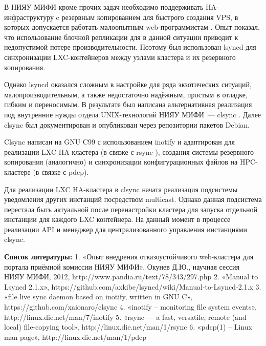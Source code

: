 \documentclass[10pt, a5paper]{article}
\begin{document}
В НИЯУ МИФИ кроме прочих задач необходимо поддерживать HA-инфраструктуру c резервным копированием для быстрого создания VPS, в которых допускается работать малоопытным web-программистам \footnotemark[1]. Опыт показал, что использование блочной репликации для в данной ситуации приводит к недопустимой потере производительности. Поэтому был использован lsyncd \footnotemark[2] для синхронизации LXC-контейнеров между узлами кластера и их резервного копирования.

Однако lsyncd оказался сложным в настройке для ряда экзотических ситуаций, малопроизводительным, а также недостаточно надёжным, простым в отладке, гибким и переносимым. В результате был написана альтернативная реализация под внутренние нужды отдела UNIX-технологий НИЯУ МИФИ — clsync \footnotemark[3]. Далее clsync был документирован и опубликован через репозитории пакетов Debian.

Clsync написан на GNU C99 с использованием inotify \footnotemark[4] и адаптирован для реализации LXC HA-кластера (в связке с rsync \footnotemark[5]), создания системы резервного копирования (аналогично) и синхронизации конфигурационных файлов на HPC-кластере (в связке с pdcp\footnotemark[6]).

Для реализации LXC HA-кластера в clsync начата реализация подсистемы уведомления других инстанций посредством multicast. Однако данная подсистема перестала быть актуальной после перенастройки кластера для запуска отдельной инстанции для каждого LXC контейнера. На данный момент в процессе реализации API и менеджер для централизованного управления инстанциями clsync.

\textbf{Список литературы:}
1. «Опыт внедрения отказоустойчивого web-кластера для портала приёмной комиссии НИЯУ МИФИ», Окунев Д.Ю., научная сессия НИЯУ МИФИ, 2012, http://www.pandia.ru/text/78/343/297.php
2. «Manual to Lsyncd 2.1.x», https://github.com/axkibe/lsyncd/wiki/Manual-to-Lsyncd-2.1.x
3. «file live sync daemon based on inotify, written in GNU C», https://github.com/xaionaro/clsync
4. «inotify -- monitoring file system events», http://linux.die.net/man/7/inotify
5. «rsync --- a fast, versatile, remote (and local) file-copying tool», http://linux.die.net/man/1/rsync
6. «pdcp(1) -- Linux man page», http://linux.die.net/man/1/pdcp
\end{document}
